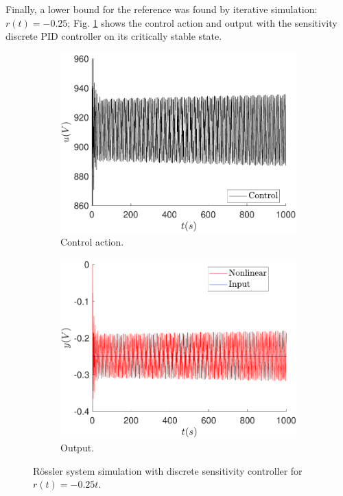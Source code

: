     Finally, a lower bound for the reference was found by iterative simulation: $r(t)=-0.25$; Fig. \ref{fig:sens_ref_lower} shows the control action and output with the sensitivity discrete PID controller on its critically stable state.
    
    \begin{figure}
        \centering
        \begin{subfigure}[b]{0.475\textwidth}
            \centering
            \includegraphics[scale=0.425]{files/heuristic/Sensitivity/control_sens_low_bound_ref.pdf}
            \caption{Control action.}
        \end{subfigure}
        \vskip0.1cm
        \begin{subfigure}[b]{0.475\textwidth}   
            \centering 
            \includegraphics[scale=0.425]{files/heuristic/Sensitivity/sens_u_-0_25.pdf}
            \caption{Output.}
        \end{subfigure}
        \caption{Rössler system simulation with discrete sensitivity controller for $r(t)=-0.25t$.}
        \label{fig:sens_ref_lower}
	\end{figure}
    
